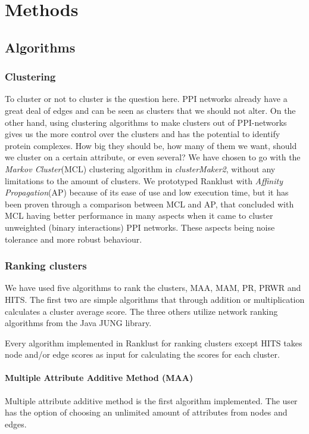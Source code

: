 \part{Methods}
\label{pa:methods}
\chapter{Algorithms}
\section{Clustering}
To cluster or not to cluster is the question here. PPI networks already have
a great deal of edges and can be seen as clusters that we should not alter. On
the other hand, using clustering algorithms to make clusters out of
PPI-networks gives us the more control over the clusters and has the potential
to identify protein complexes\cite{ap-vs-mcl}. How big they should be, how many
of them we want, should we cluster on a certain attribute, or even several? We
have chosen to go with the \textit{Markov Cluster}(MCL)\cite{mcl} clustering
algorithm in \textit{clusterMaker2}, without any limitations to the amount of
clusters. We prototyped Ranklust with \textit{Affinity
Propagation}(AP)\cite{affinity-propagation} because of its ease of use and low
execution time, but it has been proven through a comparison between MCL and AP,
that concluded with MCL having better performance in many aspects when it came
to cluster unweighted (binary interactions) PPI networks\cite{ap-vs-mcl}. These
aspects being noise tolerance and more robust behaviour.

\section{Ranking clusters}
We have used five algorithms to rank the clusters, MAA, MAM, PR, PRWR and HITS.
The first two are simple algorithms that through addition or multiplication
calculates a cluster average score. The three others utilize network ranking
algorithms from the Java JUNG\cite{jung} library.

Every algorithm implemented in Ranklust for ranking clusters except HITS takes
node and/or edge scores as input for calculating the scores for each cluster.

\subsection{Multiple Attribute Additive Method (MAA)}
Multiple attribute additive method is the first algorithm implemented.  The user
has the option of choosing an unlimited amount of attributes from nodes and
edges.

